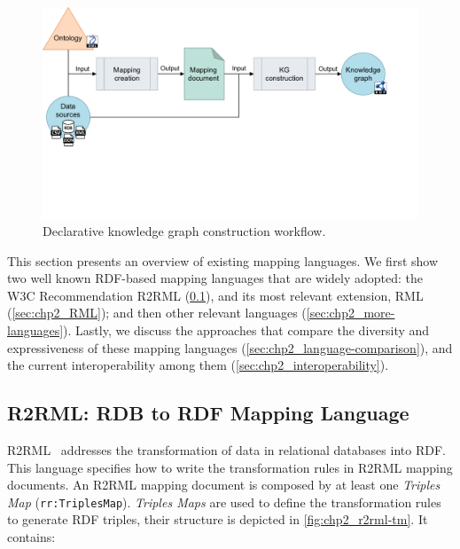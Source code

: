 \begin{figure}[h]
\centering
\includegraphics[width=0.9\linewidth]{figures/chp2_kgc-workflow.pdf}
\caption[Declarative knowledge graph construction workflow]{Declarative knowledge graph construction workflow.}
\label{fig:chp2_kgc-workflow}
\end{figure}

This section presents an overview of existing mapping languages. We first show two well known RDF-based mapping languages that are widely adopted: the W3C Recommendation R2RML (\cref{sec:chp2_R2RML}), and its most relevant extension, RML (\cref{sec:chp2_RML}); and then other relevant languages (\cref{sec:chp2_more-languages}). Lastly, we discuss the approaches that compare the diversity and expressiveness of these mapping languages (\cref{sec:chp2_language-comparison}), and the current interoperability among them (\cref{sec:chp2_interoperability}).






\subsection{R2RML: RDB to RDF Mapping Language}
\label{sec:chp2_R2RML}

R2RML~\parencite{das2012r2rml} addresses the transformation of data in relational databases into RDF. This language specifies how to write the transformation rules in R2RML mapping documents. An R2RML mapping document is composed by at least one \textit{Triples Map} (\texttt{rr:TriplesMap}). \textit{Triples Maps} are used to define the transformation rules to generate RDF triples, their structure is depicted in \cref{fig:chp2_r2rml-tm}. It contains:

